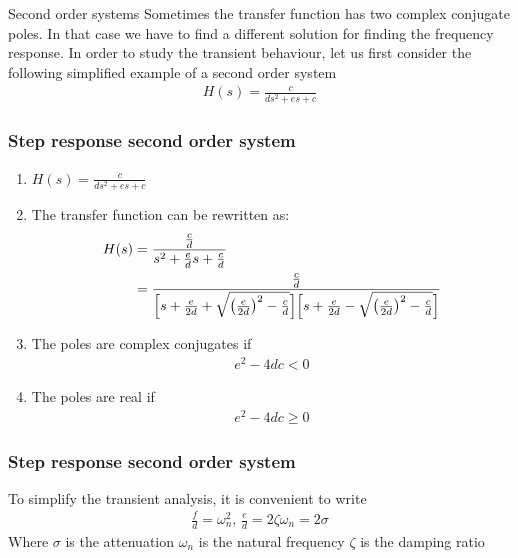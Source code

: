 \begin{frame}{Second order systems} 
\vspace{-0.5cm}
Sometimes the transfer function has two complex conjugate poles. In that case we have to find a different solution for finding the frequency response.
\vspace{1cm}
In order to study the transient behaviour, let us first consider the following simplified example of a second order system
\begin{align*}
H(s) = \frac{c}{ds^2+es+c}
\end{align*}
\vspace{-0.5cm}
\end{frame}

\begin{frame}
\frametitle{Step response second order system}
\begin{enumerate}
\item $H(s) = \frac{c}{ds^2+es+c}$
\vspace{0.25cm}
\item The transfer function can be rewritten as:
\vspace{-0.35cm}
\begin{align*}
H(s) &= \frac{\frac{c}{d}}{s^2+\frac{e}{d}s+\frac{c}{d}}
\vspace{-0.1cm}\\ &= \frac{\frac{c}{d}}{\Big[s+\frac{e}{2d}+\sqrt{\big(\frac{e}{2d}\big)^2-\frac{c}{d}}\Big]\Big[s+\frac{e}{2d}-\sqrt{\big(\frac{e}{2d}\big)^2-\frac{c}{d}}\Big]}
\end{align*}
\item The poles are complex conjugates if
\vspace{-0.5cm}
\begin{align*}
e^2 -4dc <0
\end{align*}
\vspace{-0.45cm}
\item The poles are real if
\vspace{-0.45cm}
\begin{align*}
e^2 -4dc\ge 0
\end{align*}
\end{enumerate}
\end{frame}

\begin{frame}
\frametitle{Step response second order system}

To simplify the transient analysis, it is convenient to write
\\ 
\begin{align*}
\frac{f}{d} = \omega_n ^2\text{, } \frac{e}{d}=2\zeta\omega_n=2\sigma
\end{align*}
Where 
\vspace{0.15cm}
$\sigma$ is the attenuation 
\vspace{0.3cm}
$\omega_n$ is the natural frequency 
\vspace{0.3cm}
$\zeta$ is the damping ratio
\vspace{0.25cm}
\end{frame}

